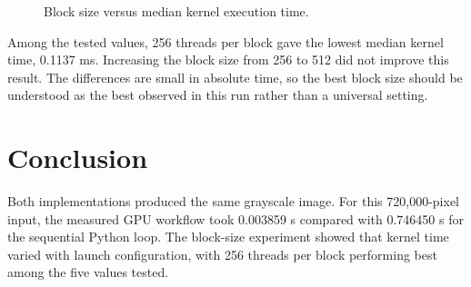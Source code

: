\documentclass[12pt,a4paper]{article}
\begin{document}
\begin{figure}[htbp]
\centering
{}
\caption{Block size versus median kernel execution time.}
\end{figure}

Among the tested values, 256 threads per block gave the lowest median kernel time, 0.1137 ms. Increasing the block size from 256 to 512 did not improve this result. The differences are small in absolute time, so the best block size should be understood as the best observed in this run rather than a universal setting.

\section{Conclusion}
Both implementations produced the same grayscale image. For this 720,000-pixel input, the measured GPU workflow took 0.003859 s compared with 0.746450 s for the sequential Python loop. The block-size experiment showed that kernel time varied with launch configuration, with 256 threads per block performing best among the five values tested.
\end{document}
